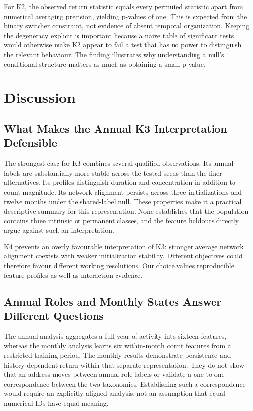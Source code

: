For K2, the observed return statistic equals every permuted statistic apart from numerical averaging precision, yielding p-values of one. This is expected from the binary switcher constraint, not evidence of absent temporal organization. Keeping the degeneracy explicit is important because a naive table of significant tests would otherwise make K2 appear to fail a test that has no power to distinguish the relevant behaviour. The finding illustrates why understanding a null's conditional structure matters as much as obtaining a small p-value.

\section{Discussion}
\subsection{What Makes the Annual K3 Interpretation Defensible}
The strongest case for K3 combines several qualified observations. Its annual labels are substantially more stable across the tested seeds than the finer alternatives. Its profiles distinguish duration and concentration in addition to count magnitude. Its network alignment persists across three initializations and twelve months under the shared-label null. These properties make it a practical descriptive summary for this representation. None establishes that the population contains three intrinsic or permanent classes, and the feature holdouts directly argue against such an interpretation.

K4 prevents an overly favourable interpretation of K3: stronger average network alignment coexists with weaker initialization stability. Different objectives could therefore favour different working resolutions. Our choice values reproducible feature profiles as well as interaction evidence.

\subsection{Annual Roles and Monthly States Answer Different Questions}
The annual analysis aggregates a full year of activity into sixteen features, whereas the monthly analysis learns six within-month count features from a restricted training period. The monthly results demonstrate persistence and history-dependent return within that separate representation. They do not show that an address moves between annual role labels or validate a one-to-one correspondence between the two taxonomies. Establishing such a correspondence would require an explicitly aligned analysis, not an assumption that equal numerical IDs have equal meaning.

